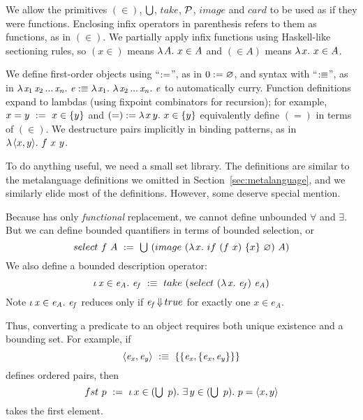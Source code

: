 We allow the primitives $(\in)$, $\textstyle\bigcup$, $take$, $\mathcal{P}$, $image$ and $card$ to be used as if they were functions. Enclosing infix operators in parenthesis refers to them as functions, as in $(\in)$. We partially apply infix functions using Haskell-like sectioning rules, so $(x \in)$ means $\lambda\mspace{2mu}{A}\ldotp\, x \in A$ and $(\in A)$ means $\lambda\mspace{2mu}{x}\ldotp\, x \in A$.

We define first-order objects using ``$:=$'', as in $0 \objdef \lemptyset$, and syntax with ``$:\equiv$'', as in
$\lambda\mspace{2mu}{\mathit{x}_1\,\mathit{x}_2\,...\,\mathit{x_n}}\ldotp\, \mathit{e} :\equiv \lambda\mspace{2mu}{\mathit{x}_1}\ldotp\, \lambda\mspace{2mu}{\mathit{x}_2\,...\,\mathit{x_n}}\ldotp\, \mathit{e}$ to automatically curry.
Function definitions expand to lambdas (using fixpoint combinators for recursion); for example, $x = y \ :=\ x \in \{{y}\}$ and $(=) := \lambda\mspace{2mu}{x\,y}\ldotp\, x \in \{{y}\}$ equivalently define $(=)$ in terms of $(\in)$.
We destructure pairs implicitly in binding patterns, as in $\lambda\mspace{2mu}{\langle{x,y}\rangle}\ldotp\, f~x~y$.


To do anything useful, we need a small set library. The definitions are similar to the metalanguage definitions we omitted in Section~\ref{sec:metalanguage}, and we similarly elide most of the \targetlang definitions. However, some deserve special mention.

Because \targetlang has only \emph{functional} replacement, we cannot define unbounded $\forall$ and $\exists$. But we can define bounded quantifiers in terms of bounded selection, or
\begin{equation}
	select~f~A\ \objdef\ \U~(image~(\fun{x} if~(f~x)~\set{x}~\lemptyset)~A)
\end{equation}
We also define a bounded description operator:
\begin{equation}
	\iota\,{\mathit{x} \in \mathit{e_A}}\ldotp\, \mathit{e_f}\ :\equiv\ take~(select~(\lambda\mspace{2mu}{\mathit{x}}\ldotp\, \mathit{e_f})~\mathit{e_A})
\end{equation}
Note $\iota\,{\mathit{x} \in \mathit{e_A}}\ldotp\, \mathit{e_f}$ reduces only if $\mathit{e_f} \operatorname{\Downarrow} true$ for exactly one $\mathit{x} \in \mathit{e_A}$.

Thus, converting a predicate to an object requires both unique existence and a bounding set. For example, if
\begin{equation}
	\pair{\mathit{e_x},\mathit{e_y}}\ \objstx\ \set{\set{\mathit{e_x}, \set{\mathit{e_x},\mathit{e_y}}}}
\end{equation}
defines ordered pairs, then
\begin{equation}
	fst~p\ \objdef\ \The{x \in (\U~p)} \Exists{y \in (\U~p)} p = \pair{x,y}
\end{equation}
takes the first element.

